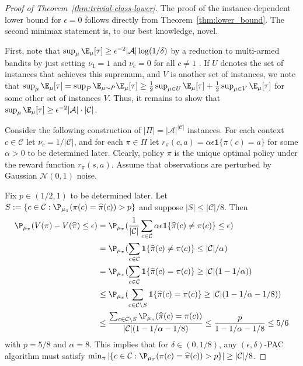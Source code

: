 \documentclass{article}
\newcommand{\mc}[1]{\mathcal{#1}}
\newcommand{\1}{\mathbf{1}}
\begin{document}
\begin{proof}[Proof of Theorem~\ref{thm:trivial-class-lower}]
The proof of the instance-dependent lower bound for $\epsilon=0$ follows directly from Theorem~\ref{thm:lower_bound}.
The second minimax statement is, to our best knowledge, novel. 

First, note that $\sup_\mu \E_\mu[\tau] \geq \epsilon^{-2}|\mc{A}| \log(1/ \delta)$ by a reduction to multi-armed bandits by just setting $\nu_1 = 1$ and $\nu_c =0$ for all $c \neq 1$ \cite{mannor2003lower,kaufmann2016complexity}.
If $U$ denotes the set of instances that achieves this supremum, and $V$ is another set of instances, we note that
$\sup_\mu \E_\mu[\tau] = \sup_{P} \E_{\mu \sim P} \E_\mu[\tau] \geq \frac{1}{2} \sup_{\mu \in U} \E_\mu[\tau] + \frac{1}{2} \sup_{\mu \in V} \E_\mu[\tau]$ for some other set of instances $V$.
Thus, it remains to show that $\sup_\mu \E_\mu[\tau] \geq \epsilon^{-2}|\mc{A}| \cdot |\mc{C}|$.

Consider the following construction of $|\Pi| = |\mc{A}|^{|\mc{C}|}$ instances.
For each context $c \in \mc{C}$ let $\nu_c = 1/|\mc{C}|$, and for each $\pi \in \Pi$ let $r_\pi(c,a) = \alpha \epsilon \1\{ \pi(c) = a \}$ for some $\alpha >0$ to be determined later. 
Clearly, policy $\pi$ is the unique optimal policy under the reward function $r_\pi(s,a)$. 
Assume that observations are perturbed by Gaussian $\mc{N}(0,1)$ noise.

Fix $p \in (1/2,1)$ to be determined later. 
Let $S := \{ c \in \mc{C}: \P_{\mu_\pi}( \pi(c) = \widehat{\pi}(c) ) > p \}$ and suppose $|S| \leq |\mc{C}|/8$.
Then 
\begin{align*}
    \P_{\mu_\pi}( V(\pi) - V(\widehat{\pi}) \leq \epsilon ) &= \P_{\mu_\pi}( \frac{1}{|\mc{C}|} \sum_{c \in \mc{C}} \alpha \epsilon \1\{ \widehat{\pi}(c) \neq \pi(c) \} \leq \epsilon ) \\
    &= \P_{\mu_\pi}(  \sum_{c \in \mc{C}} \1\{ \widehat{\pi}(c) \neq \pi(c) \} \leq |\mc{C}| / \alpha )  \\
    &= \P_{\mu_\pi}(  \sum_{c \in \mc{C}} \1\{ \widehat{\pi}(c) = \pi(c) \} \geq |\mc{C}|(1-1 / \alpha) )  \\
    &\leq \P_{\mu_\pi}(  \sum_{c \in \mc{C} \setminus S} \1\{ \widehat{\pi}(c) = \pi(c) \} \geq |\mc{C}| (1 - 1/ \alpha - 1/8) ) \\
    &\leq \frac{\sum_{c \in \mc{C} \setminus S} \P_{\mu_\pi}(\widehat{\pi}(c) = \pi(c)) }{|\mc{C}|(1 - 1/ \alpha - 1/8)} \leq \frac{p}{1 - 1/ \alpha  - 1/8} \leq 5/6
\end{align*}
with $p = 5/8$ and $\alpha=8$.  
This implies that for $\delta \in (0,1/8)$, any $(\epsilon,\delta)$-PAC algorithm must satisfy $\min_\pi |\{ c \in \mc{C}: \P_{\mu_\pi}( \pi(c) = \widehat{\pi}(c) ) > p \}| \geq |\mc{C}| /8$.


\end{proof}
\end{document}

